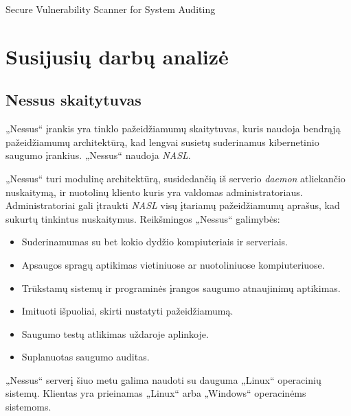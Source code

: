 \documentclass[a4paper,12pt,fleqn]{article}
\begin{document}
\bothabstracts{}%
{Secure Vulnerability Scanner for System Auditing} %
{}%






\newpage
\section{Susijusių darbų analizė}
\label{sec:motivation}

\subsection{Nessus skaitytuvas}
\label{sec:example}

„Nessus“ įrankis yra tinklo pažeidžiamumų skaitytuvas, kuris naudoja bendrąją pažeidžiamumų architektūrą, kad lengvai susietų suderinamus kibernetinio saugumo įrankius. „Nessus“ naudoja \textit{NASL}\cite{rogers2011nessus}. 

„Nessus“ turi modulinę architektūrą, susidedančią iš serverio \textit{daemon} atliekančio nuskaitymą, ir nuotolinų kliento kuris yra valdomas administratoriaus. Administratoriai gali įtraukti \textit{NASL} visų įtariamų pažeidžiamumų aprašus, kad sukurtų tinkintus nuskaitymus. Reikšmingos „Nessus“ galimybės:

\begin{itemize}
	\item Suderinamumas su bet kokio dydžio kompiuteriais ir serveriais.
	\item Apsaugos spragų aptikimas vietiniuose ar nuotoliniuose kompiuteriuose.
	\item Trūkstamų sistemų ir programinės įrangos saugumo atnaujinimų aptikimas.
	\item Imituoti išpuoliai, skirti nustatyti pažeidžiamumą.
	\item Saugumo testų atlikimas uždaroje aplinkoje.
	\item Suplanuotas saugumo auditas.
\end{itemize}

„Nessus“ serverį šiuo metu galima naudoti su dauguma „Linux“ operacinių sistemų. Klientas yra prieinamas „Linux“ arba „Windows“ operacinėms sistemoms. 
\end{document}
